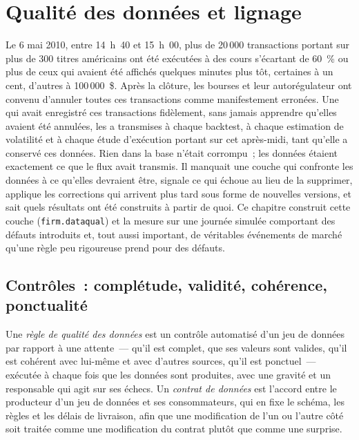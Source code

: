 \chapter{Qualité des données et lignage}\label{ch:pl:data-quality-and-lineage}

Le 6 mai 2010, entre 14~h~40 et 15~h~00, plus de 20\,000 transactions portant sur plus de 300 titres américains ont été exécutées à
des cours s'écartant de 60~\% ou plus de ceux qui avaient été affichés quelques minutes plus tôt, certaines à un cent, d'autres à 100\,000~\$. Après la clôture, les
bourses et leur autorégulateur ont convenu d'annuler toutes ces transactions comme manifestement erronées. Une  qui avait enregistré ces
transactions fidèlement, sans jamais apprendre qu'elles avaient été annulées, les a transmises à chaque backtest, à chaque estimation
de volatilité et à chaque étude d'exécution portant sur cet après-midi, tant qu'elle a conservé ces données. Rien dans la base n'était corrompu~; les données étaient
exactement ce que le flux avait transmis. Il manquait une couche qui confronte les données à ce qu'elles devraient être, signale ce qui
échoue au lieu de la supprimer, applique les corrections qui arrivent plus tard sous forme de nouvelles versions, et sait quels résultats ont été
construits à partir de quoi. Ce chapitre construit cette couche (\texttt{firm.dataqual}) et la mesure sur une journée simulée comportant des défauts introduits et,
tout aussi important, de véritables événements de marché qu'une règle peu rigoureuse prend pour des défauts.

\section{Contrôles~: complétude, validité, cohérence, ponctualité}

\begin{definition}\label{def:pl:data-quality-and-lineage:rule}
Une \emph{règle de qualité des données} est un contrôle automatisé d'un jeu de données par rapport à une attente~--- qu'il est
complet, que ses valeurs sont valides, qu'il est cohérent avec lui-même et avec d'autres sources, qu'il est ponctuel~--- exécutée
à chaque fois que les données sont produites, avec une gravité et un responsable qui agit sur ses échecs. Un \emph{contrat de données}
est l'accord entre le producteur d'un jeu de données et ses consommateurs, qui en fixe le schéma, les règles et les délais de livraison, afin que
une modification de l'un ou l'autre côté soit traitée comme une modification du contrat plutôt que comme une surprise.
\end{definition}

